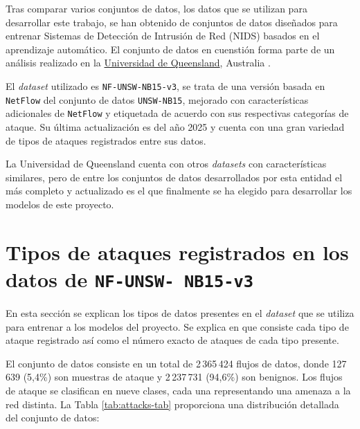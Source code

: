 Tras comparar varios conjuntos de datos, los datos que se utilizan para desarrollar este trabajo, se han obtenido de  conjuntos de datos diseñados para entrenar Sistemas de Detección de Intrusión de Red (NIDS) basados en el aprendizaje automático. El conjunto de datos en cuenstión  forma parte de un análisis realizado en la \href{https://staff.itee.uq.edu.au/marius/NIDS_datasets/}{Universidad de Queensland}, Australia \cite{luay2025NetFlowDatasetsV3}.

El \textit{dataset} utilizado es \texttt{NF-UNSW-NB15-v3}, se trata de una versión basada en \texttt{NetFlow} del conjunto de datos \texttt{UNSW-NB15}, mejorado con características adicionales de \texttt{NetFlow} y etiquetada de acuerdo con sus respectivas categorías de ataque. Su última actualización es del año 2025 y cuenta con una gran variedad de tipos de ataques registrados entre sus datos.

La Universidad de Queensland cuenta con otros \textit{datasets} con características similares, pero de entre los conjuntos de datos desarrollados por esta entidad el más completo y actualizado es el que finalmente se ha elegido para desarrollar los modelos de este proyecto.

\section{Tipos de ataques registrados en los datos de \texttt{NF-UNSW- NB15-v3}} \label{sec.tipo-ataques}
En esta sección se explican los tipos de datos presentes en el \textit{dataset} que se utiliza para entrenar a los modelos del proyecto. Se explica en que consiste cada tipo de ataque registrado así como el número exacto de ataques de cada tipo presente.

El conjunto de datos consiste en un total de 2\,365\,424 flujos de datos, donde 127\,639 (5,4\%) son muestras de ataque y 2\,237\,731 (94,6\%) son benignos. Los flujos de ataque se clasifican en nueve clases, cada una representando una amenaza a la red distinta. La Tabla \ref{tab:attacks-tab} proporciona una distribución detallada del conjunto de datos:

